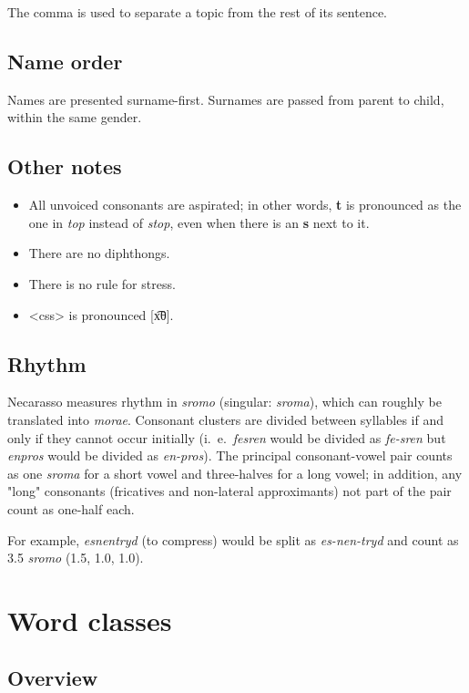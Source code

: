 \documentclass{book}
\begin{document}
The comma is used to separate a topic from the rest of its sentence.

\section{Name order}

Names are presented surname-first. Surnames are passed from parent to child, within the same gender.

\section{Other notes}

\begin{itemize}
  \item All unvoiced consonants are aspirated; in other words, \textbf{t} is pronounced as the one in \emph{top} instead of \emph{stop}, even when there is an \textbf{s} next to it.
  \item There are no diphthongs.
  \item There is no rule for stress.
  \item <css> is pronounced [x͡θ].
\end{itemize}

\section{Rhythm}

Necarasso measures rhythm in \emph{sromo} (singular: \emph{sroma}), which can roughly be translated into \emph{morae}. Consonant clusters are divided between syllables if and only if they cannot occur initially (i.~e.~\emph{fesren} would be divided as \emph{fe-sren} but \emph{enpros} would be divided as \emph{en-pros}). The principal consonant-vowel pair counts as one \emph{sroma} for a short vowel and three-halves for a long vowel; in addition, any "long" consonants (fricatives and non-lateral approximants) not part of the pair count as one-half each.

For example, \emph{esnentryd} (to compress) would be split as \emph{es-nen-tryd} and count as 3.5 \emph{sromo} (1.5, 1.0, 1.0).

\chapter{Word classes}

\section{Overview}
\end{document}
